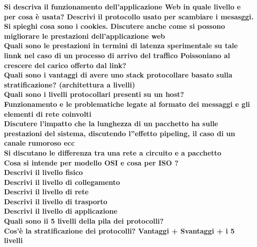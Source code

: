 \documentclass[11pt, oneside]{article}   	%
\begin{document}
\textbf{Si descriva il funzionamento dell’applicazione Web in quale livello e per cosa è usata? Descrivi il protocollo usato per scambiare i mesasggi. Si spieghi cosa sono i cookies. Discutere anche come si possono migliorare le prestazioni dell’applicazione web}\\

\textbf{Quali sono le prestazioni in termini di latenza sperimentale su tale linnk nel caso di un processo di arrivo del traffico Poissoniano al crescere del carico offerto dal link?}\\

\textbf{Quali sono i vantaggi di avere uno stack protocollare basato sulla stratificazione? (architettura a livelli)}\\

\textbf{Quali sono i livelli protocollari presenti su un host?}\\

\textbf{Funzionamento e le problematiche legate al formato dei messaggi e gli elementi di rete coinvolti}\\

\textbf{Discutere l'impatto che la lunghezza di un pacchetto ha sulle prestazioni del sistema, discutendo l''effetto pipeling, il caso di un canale rumoroso ecc}\\

\textbf{Si discutano le differenza tra una rete a circuito e a pacchetto}\\

\textbf{Cosa si intende per modello OSI e cosa per ISO ?}\\

\textbf{Descrivi il livello fisico}\\

\textbf{Descrivi il livello di collegamento}\\

\textbf{Descrivi il livello di rete}\\

\textbf{Descrivi il livello di trasporto}\\

\textbf{Descrivi il livello di applicazione}\\

\textbf{Quali sono ii 5 livelli della pila dei protocolli?}\\

\textbf{Cos’è la stratificazione dei protocolli? Vantaggi + Svantaggi + i 5 livelli}\\
\end{document}
